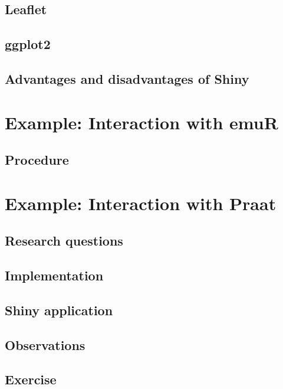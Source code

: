 \documentclass[]{book}
\theoremstyle{definition}
\theoremstyle{definition}
\theoremstyle{definition}
\theoremstyle{remark}
\begin{document}
\section{Leaflet}\label{leaflet}

\section{ggplot2}\label{ggplot2}

\section{Advantages and disadvantages of
Shiny}\label{advantages-and-disadvantages-of-shiny}

\chapter{Example: Interaction with
emuR}\label{example-interaction-with-emur}

\section{Procedure}\label{procedure}

\chapter{Example: Interaction with
Praat}\label{example-interaction-with-praat}

\section{Research questions}\label{research-questions}

\section{Implementation}\label{implementation}

\section{Shiny application}\label{shiny-application}

\section{Observations}\label{observations}

\section{Exercise}\label{exercise}
\end{document}
